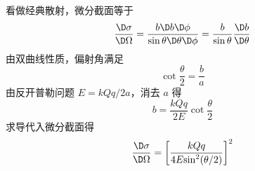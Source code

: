 
看做经典散射，微分截面等于
\begin{equation}
\frac{{\D \sigma }}{{\D \Omega }} = \frac{{b\D b\D \phi }}{{\sin \theta \D \theta \D \phi }} = \frac{b}{{\sin \theta }}\frac{{\D b}}{{\D \theta }}
\end{equation}
由双曲线性质，偏射角满足
\begin{equation}
\cot{\frac{\theta }{2}}= \frac{b}{a}
\end{equation}
由反开普勒问题  $E = {{kQq}}/{{2a}}$，消去 $a$ 得
\begin{equation}
b = \frac{{kQq}}{{2E}}\cot {\frac{\theta }{2}}
\end{equation}
求导代入微分截面得
\begin{equation}
\frac{{\D \sigma }}{{\D \Omega }} = {\left[ {\frac{{kQq}}{{4E{{\sin }^2}(\theta /2)}}} \right]^2}
\end{equation}

